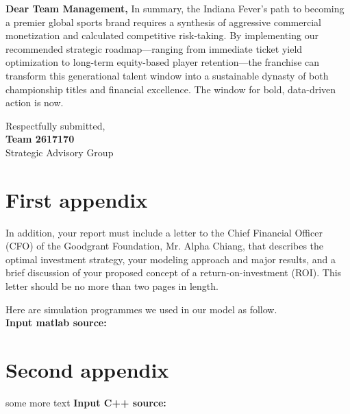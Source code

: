 \documentclass{mcmthesis}
\begin{document}
\begin{letter}{\textbf{Dear Team Management,}}
In summary, the Indiana Fever’s path to becoming a premier global sports brand requires a synthesis of aggressive commercial monetization and calculated competitive risk-taking. By implementing our recommended strategic roadmap---ranging from immediate ticket yield optimization to long-term equity-based player retention---the franchise can transform this generational talent window into a sustainable dynasty of both championship titles and financial excellence. The window for bold, data-driven action is now.

\vspace{0.5cm}

\noindent Respectfully submitted,\\[0.3cm]
\textbf{Team 2617170}\\
Strategic Advisory Group

\end{letter}

\newpage

\begin{appendices}   %

\section{First appendix}

In addition, your report must include a letter to the Chief Financial Officer (CFO) of the Goodgrant Foundation, Mr. Alpha Chiang, that describes the optimal investment strategy, your modeling approach and major results, and a brief discussion of your proposed concept of a return-on-investment (ROI). This letter should be no more than two pages in length.

Here are simulation programmes we used in our model as follow.\\

\textbf{\textcolor[rgb]{0.98,0.00,0.00}{Input matlab source:}}
% 

\section{Second appendix}

some more text \textcolor[rgb]{0.98,0.00,0.00}{\textbf{Input C++ source:}}
% 

\end{appendices}

\newpage
{}
\setcounter{lastpage}{\value{page}}
\thispagestyle{empty} 
\end{document}
